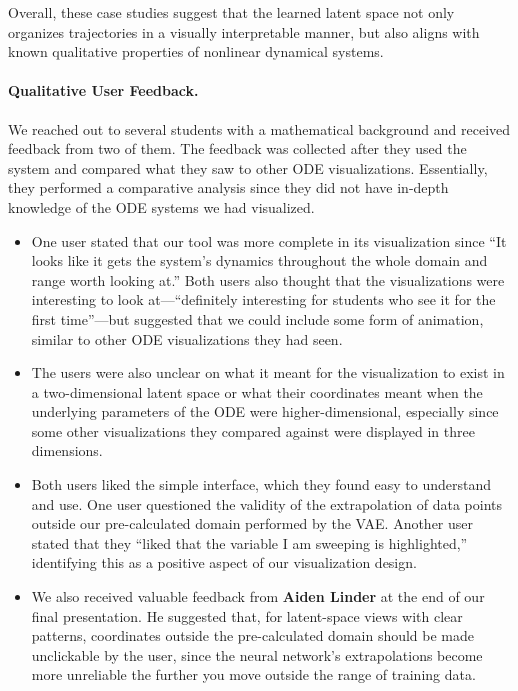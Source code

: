 \documentclass{article}
\begin{document}
Overall, these case studies suggest that the learned latent space not only
organizes trajectories in a visually interpretable manner, but also aligns
with known qualitative properties of nonlinear dynamical systems.


\paragraph{Qualitative User Feedback.}

We reached out to several students with a mathematical background and received
feedback from two of them. The feedback was collected after they used the
system and compared what they saw to other ODE visualizations. Essentially,
they performed a comparative analysis since they did not have in-depth
knowledge of the ODE systems we had visualized.

\begin{itemize}
    
\item 
One user stated that our tool was more complete in its visualization since
``It looks like it gets the system's dynamics throughout the whole domain and
range worth looking at.'' Both users also thought that the visualizations were
interesting to look at---``definitely interesting for students who see it for
the first time''---but suggested that we could include some form of animation,
similar to other ODE visualizations they had seen.

\item The users were also unclear on what it meant for the visualization to exist in
a two-dimensional latent space or what their coordinates meant when the underlying parameters of the ODE were
higher-dimensional, especially since some other visualizations they compared against
were displayed in three dimensions.

\item 
Both users liked the simple interface, which they found easy to understand and
use. One user questioned the validity of the extrapolation of data points
outside our pre-calculated domain performed by the VAE. Another user stated
that they ``liked that the variable I am sweeping is highlighted,'' identifying
this as a positive aspect of our visualization design.

\item 
We also received valuable feedback from
\textbf{Aiden Linder} at the end of our final presentation. He suggested that,
for latent-space views with clear patterns, coordinates outside the
pre-calculated domain should be made unclickable by the user, since the neural
network's extrapolations become more unreliable the further you move outside the range of training data.
\end{itemize}
\end{document}
